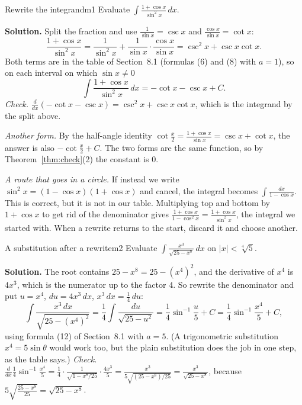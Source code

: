 \documentclass[11pt]{article}
\begin{document}
\begin{exmp}{Rewrite the integrand}{m1}
Evaluate $\displaystyle\int\frac{1+\cos x}{\sin^2x}\,dx$.

\textbf{Solution.} Split the fraction and use $\frac1{\sin x}=\csc x$ and $\frac{\cos x}{\sin x}=\cot x$:
\[\frac{1+\cos x}{\sin^2x}=\frac1{\sin^2x}+\frac1{\sin x}\cdot\frac{\cos x}{\sin x}=\csc^2x+\csc x\cot x .\]
Both terms are in the table of Section~8.1 (formulas (6) and (8) with $a=1$), so on each interval on which $\sin x\ne0$
\[\int\frac{1+\cos x}{\sin^2x}\,dx=-\cot x-\csc x+C .\]
\emph{Check.} $\frac d{dx}(-\cot x-\csc x)=\csc^2x+\csc x\cot x$, which is the integrand by the split above.

\emph{Another form.} By the half-angle identity $\cot\frac x2=\frac{1+\cos x}{\sin x}=\csc x+\cot x$, the answer is also $-\cot\frac x2+C$. The two forms are the same function, so by Theorem~\ref{thm:check}(2) the constant is $0$.

\emph{A route that goes in a circle.} If instead we write $\sin^2x=(1-\cos x)(1+\cos x)$ and cancel, the integral becomes $\int\frac{dx}{1-\cos x}$. This is correct, but it is not in our table. Multiplying top and bottom by $1+\cos x$ to get rid of the denominator gives $\frac{1+\cos x}{1-\cos^2x}=\frac{1+\cos x}{\sin^2x}$, the integral we started with. When a rewrite returns to the start, discard it and choose another.
\end{exmp}

\begin{exmp}{A substitution after a rewrite}{m2}
Evaluate $\displaystyle\int\frac{x^3}{\sqrt{25-x^8}}\,dx$ on $\lvert x\rvert<\sqrt[4]5$.

\textbf{Solution.} The root contains $25-x^8=25-(x^4)^2$, and the derivative of $x^4$ is $4x^3$, which is the numerator up to the factor $4$. So rewrite the denominator and put $u=x^4$, $du=4x^3\,dx$, $x^3\,dx=\frac14\,du$:
\[\int\frac{x^3\,dx}{\sqrt{25-(x^4)^2}}=\frac14\int\frac{du}{\sqrt{25-u^2}}=\frac14\sin^{-1}\frac u5+C=\frac14\sin^{-1}\frac{x^4}5+C,\]
using formula (12) of Section~8.1 with $a=5$. (A trigonometric substitution $x^4=5\sin\theta$ would work too, but the plain substitution does the job in one step, as the table says.)
\emph{Check.} $\frac d{dx}\frac14\sin^{-1}\frac{x^4}5=\frac14\cdot\frac1{\sqrt{1-x^8/25}}\cdot\frac{4x^3}5=\frac{x^3}{5\sqrt{(25-x^8)/25}}=\frac{x^3}{\sqrt{25-x^8}}$, because $5\sqrt{\frac{25-x^8}{25}}=\sqrt{25-x^8}$.
\end{exmp}
\end{document}

